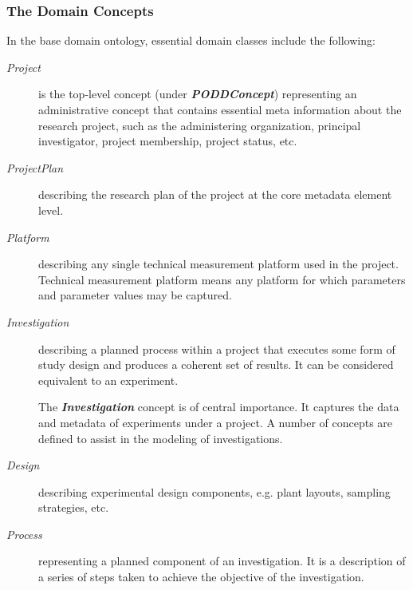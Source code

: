 \documentclass{elsarticle}
\begin{document}
\subsubsection{The Domain Concepts}
In the base domain ontology, essential domain classes include the following:

\begin{description}
\item[\emph{Project}] is the top-level
concept (under \textbf{\emph{PODDConcept}}) representing
an administrative concept that contains essential meta
information about the research project, such as the
administering organization, principal
investigator, project membership, project status, etc.

\item[\emph{ProjectPlan}] describing the research
plan of the project at the core metadata element level.

\item[\emph{Platform}] describing any single technical
measurement platform used in the project. Technical measurement
platform means any platform for which parameters and parameter
values may be captured.


\item[\emph{Investigation}] describing a planned process
within a project that executes some form of study design and
produces a coherent set of results. It can be considered equivalent
to an experiment.

The \textbf{\emph{Investigation}} concept is of central importance.
It captures the data and metadata of experiments under a project. A
number of concepts are defined to assist in the modeling of
investigations.

\item[\emph{Design}] describing experimental design
components, e.g. plant layouts, sampling strategies, etc.


\item[\emph{Process}] representing a planned component of an
investigation. It is a description of a series of steps taken to
achieve the objective of the investigation.


\end{description}
\end{document}
